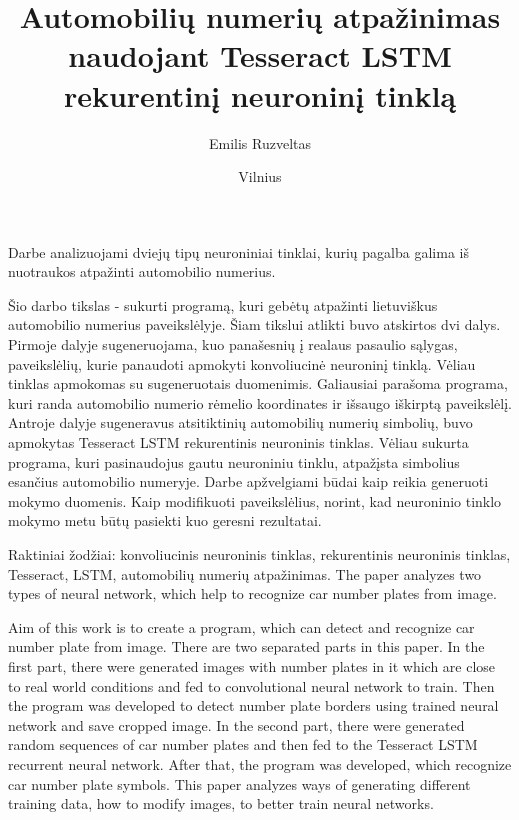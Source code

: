 \documentclass{VUMIFInfBakalaurinis}
\title{Automobilių numerių atpažinimas naudojant Tesseract LSTM rekurentinį neuroninį tinklą}
\author{Emilis Ruzveltas}
\date{Vilnius \\ \the\year}
\begin{document}
\maketitle

Darbe analizuojami dviejų tipų neuroniniai tinklai, kurių pagalba galima iš nuotraukos atpažinti automobilio numerius.

Šio darbo tikslas - sukurti programą, kuri gebėtų atpažinti lietuviškus automobilio numerius paveikslėlyje.
Šiam tikslui atlikti buvo atskirtos dvi dalys. Pirmoje dalyje sugeneruojama, kuo panašesnių į realaus pasaulio sąlygas,
paveikslėlių, kurie panaudoti apmokyti konvoliucinė neuroninį tinklą. Vėliau tinklas apmokomas su sugeneruotais duomenimis.
Galiausiai parašoma programa, kuri randa automobilio numerio rėmelio koordinates ir išsaugo iškirptą paveikslėlį.
Antroje dalyje sugeneravus atsitiktinių automobilių numerių simbolių, buvo apmokytas Tesseract LSTM rekurentinis neuroninis
tinklas. Vėliau sukurta programa, kuri pasinaudojus gautu neuroniniu tinklu, atpažįsta simbolius esančius automobilio numeryje.
Darbe apžvelgiami būdai kaip reikia generuoti mokymo duomenis. Kaip modifikuoti paveikslėlius, norint,
kad neuroninio tinklo mokymo metu būtų pasiekti kuo geresni rezultatai.

Raktiniai žodžiai: konvoliucinis neuroninis tinklas, rekurentinis neuroninis tinklas, Tesseract, LSTM, automobilių numerių atpažinimas.
\newpage
{}
The paper analyzes two types of neural network, which help to recognize car number plates from image.

Aim of this work is to create a program, which can detect and recognize car number plate from image.
There are two separated parts in this paper. In the first part, there were generated images with number plates in it 
which are close to real world conditions and fed to convolutional neural network to train. Then the program was developed to 
detect number plate borders using trained neural network and save cropped image.
In the second part, there were generated random sequences of car number plates and then fed to the Tesseract LSTM recurrent 
neural network. After that, the program was developed, which recognize car number plate symbols.
This paper analyzes ways of generating different training data, how to modify images, to better train neural networks.
\end{document}
